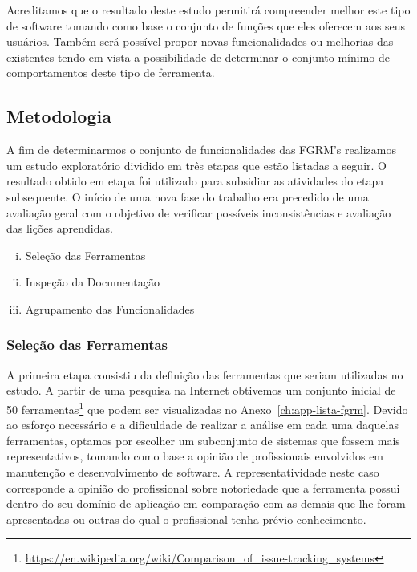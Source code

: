 Acreditamos que o resultado deste estudo permitirá compreender melhor este tipo
de software tomando como base o conjunto de funções que eles oferecem aos seus
usuários. Também será possível propor novas funcionalidades ou melhorias das
existentes tendo em vista a possibilidade de determinar o conjunto mínimo de
comportamentos deste tipo de ferramenta.

\subsection{Metodologia}
\label{subsec:metodologia}

A fim de determinarmos o conjunto de funcionalidades das FGRM's realizamos um
estudo exploratório dividido em três etapas que estão listadas a seguir. O
resultado obtido em etapa foi utilizado para subsidiar as atividades do etapa
subsequente. O início de uma nova fase do trabalho era precedido de uma
avaliação geral com o objetivo de verificar possíveis inconsistências e
avaliação das lições aprendidas.

\begin{enumerate}[(i)]
	\item Seleção das Ferramentas
	\item Inspeção da Documentação
	\item Agrupamento das Funcionalidades
\end{enumerate}

\subsubsection{Seleção das Ferramentas}
\label{subsubsec:selecao-ferramentas}

A primeira etapa consistiu da definição das ferramentas que seriam utilizadas no
estudo. A partir de uma pesquisa na Internet obtivemos um conjunto inicial de 50
ferramentas\footnote{\url{https://en.wikipedia.org/wiki/Comparison_of_issue-tracking_systems}}
que podem ser visualizadas no Anexo~\ref{ch:app-lista-fgrm}. Devido ao esforço
necessário e a dificuldade de realizar a análise em cada uma daquelas
ferramentas, optamos por escolher um subconjunto de sistemas que fossem mais
representativos, tomando como base a opinião de profissionais envolvidos em
manutenção e desenvolvimento de software. A representatividade neste caso
corresponde a opinião do profissional sobre notoriedade que a ferramenta possui
dentro do seu domínio de aplicação em comparação com as demais que lhe foram
apresentadas ou outras do qual o profissional tenha prévio conhecimento.


